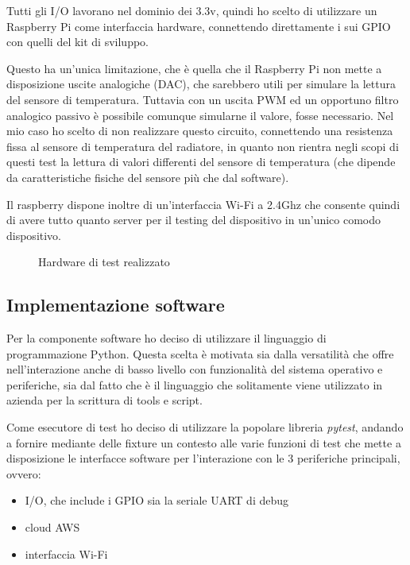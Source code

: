 \documentclass[a4paper,titlepage]{article}
\begin{document}
Tutti gli I/O lavorano nel dominio dei 3.3v, quindi ho scelto di utilizzare un
Raspberry Pi come interfaccia hardware, connettendo direttamente i sui GPIO con
quelli del kit di sviluppo.

Questo ha un'unica limitazione, che è quella che il Raspberry Pi non mette a disposizione
uscite analogiche (DAC), che sarebbero utili per simulare la lettura del sensore di
temperatura. Tuttavia con un uscita PWM ed un opportuno filtro analogico passivo è
possibile comunque simularne il valore, fosse necessario. Nel mio caso ho scelto di
non realizzare questo circuito, connettendo una resistenza fissa al sensore di
temperatura del radiatore, in quanto non rientra negli scopi di questi test la lettura
di valori differenti del sensore di temperatura (che dipende da caratteristiche fisiche
del sensore più che dal software).

Il raspberry dispone inoltre di un'interfaccia Wi-Fi a 2.4Ghz che consente quindi di
avere tutto quanto server per il testing del dispositivo in un'unico comodo dispositivo.

\begin{figure}
    \caption{Hardware di test realizzato}
    \label{quadretto}
\end{figure}

\subsection{Implementazione software}

Per la componente software ho deciso di utilizzare il linguaggio di programmazione
Python. Questa scelta è motivata sia dalla versatilità che offre nell'interazione anche
di basso livello con funzionalità del sistema operativo e periferiche, sia dal fatto
che è il linguaggio che solitamente viene utilizzato in azienda per la scrittura di
tools e script.

Come esecutore di test ho deciso di utilizzare la popolare libreria \textit{pytest},
andando a fornire mediante delle fixture un contesto alle varie funzioni di test che
mette a disposizione le interfacce software per l'interazione con le 3 periferiche
principali, ovvero:

\begin{itemize}
    \item I/O, che include i GPIO sia la seriale UART di debug
    \item cloud AWS
    \item interfaccia Wi-Fi
\end{itemize}
\end{document}
